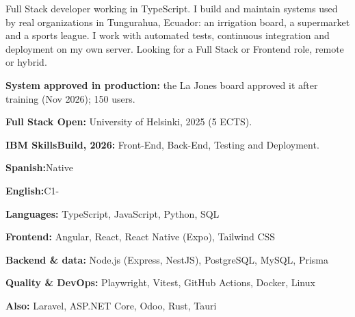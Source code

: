 \documentclass[9pt]{extarticle}
\begin{document}
\fondo
\noindent
\begin{minipage}[t]{\anchoTextoLateral}
\vspace{0pt}
\vspace{14pt}
\color{white}\small\raggedright
{}

Full Stack developer working in TypeScript. I build and maintain systems used by real organizations in Tungurahua, Ecuador: an irrigation board, a supermarket and a sports league. I work with automated tests, continuous integration and deployment on my own server. Looking for a Full Stack or Frontend role, remote or hybrid.

\begin{vinetasLateral}
  \item \textbf{System approved in production:} the La Jones board approved it after training (Nov 2026); 150 users.
  \item \textbf{Full Stack Open:} University of Helsinki, 2025 (5 ECTS).
  \item \textbf{IBM SkillsBuild, 2026:} Front-End, Back-End, Testing and Deployment.
\end{vinetasLateral}

\textbf{Spanish:}\hfill Native\par\vspace{2pt}
\vspace{4pt}
\textbf{English:}\hfill C1-\par\vspace{2pt}
\vspace{1pt}{\footnotesize English proficiency certificate, UTA, 2024}\par

\textbf{Languages:} TypeScript, JavaScript, Python, SQL\par\vspace{3pt}
\textbf{Frontend:} Angular, React, React Native (Expo), Tailwind CSS\par\vspace{3pt}
\textbf{Backend \& data:} Node.js (Express, NestJS), PostgreSQL, MySQL, Prisma\par\vspace{3pt}
\textbf{Quality \& DevOps:} Playwright, Vitest, GitHub Actions, Docker, Linux\par\vspace{3pt}
\textbf{Also:} Laravel, ASP.NET Core, Odoo, Rust, Tauri\par
\end{minipage}%
\end{document}
